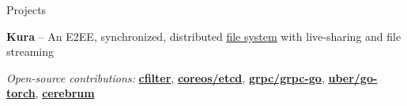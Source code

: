 \documentclass{resume} %
\begin{document}
\begin{rSection}{Projects}
  \begin{rProjectSection}{}{}
    \item \textbf {Kura} -- An E2EE, synchronized, distributed
      \href{https://github.com/kurafs/kura}{\underline{file system}} with
      live-sharing and file streaming
  \end{rProjectSection}

  \begin{rBlurbSection}
    \item {\em Open-source contributions:}
      \href{https://github.com/irfansharif/cfilter}{\textbf{cfilter}},
      \href{https://github.com/coreos/etcd/pull/8288}{\textbf{coreos/etcd}},
      \href{https://github.com/grpc/grpc-go/pull/1478}{\textbf{grpc/grpc-go}},
      \href{https://github.com/uber/go-torch/pull/62}{\textbf{uber/go-torch}},
      \href{https://rubygems.org/gems/cerebrum}{\textbf{cerebrum}}
  \end{rBlurbSection}
\end{rSection}
\end{document}
